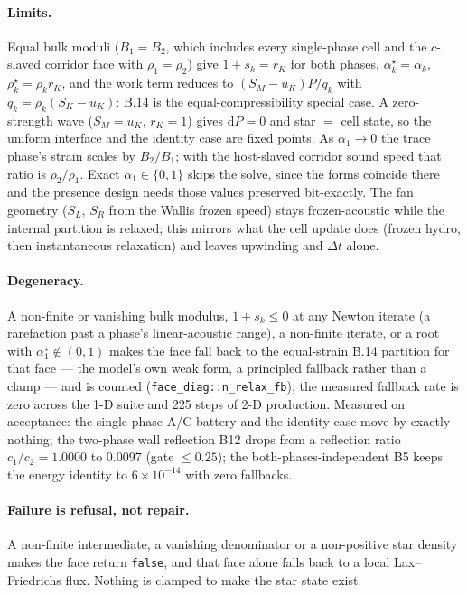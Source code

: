 \documentclass[11pt,a4paper]{article}
\newcommand{\code}[1]{\texttt{\small #1}}
\begin{document}
\paragraph{Limits.}
Equal bulk moduli ($B_1=B_2$, which includes every single-phase cell and the
$c$-slaved corridor face with $\rho_1=\rho_2$) give $1+s_k=r_K$ for both
phases, $\alpha_k^\star=\alpha_k$, $\rho_k^\star=\rho_kr_K$, and the work term
reduces to $(S_M-u_K)P/q_k$ with $q_k=\rho_k(S_K-u_K)$: B.14 is the
equal-compressibility special case.  A zero-strength wave ($S_M=u_K$,
$r_K=1$) gives $\mathrm{d}P=0$ and star $=$ cell state, so the uniform
interface and the identity case are fixed points.  As $\alpha_1\to0$ the
trace phase's strain scales by $B_2/B_1$; with the host-slaved corridor
sound speed that ratio is $\rho_2/\rho_1$.  Exact $\alpha_1\in\{0,1\}$ skips
the solve, since the forms coincide there and the presence design needs those
values preserved bit-exactly.  The fan geometry ($S_L$, $S_R$ from the Wallis
frozen speed) stays frozen-acoustic while the internal partition is relaxed;
this mirrors what the cell update does (frozen hydro, then instantaneous
relaxation) and leaves upwinding and $\Delta t$ alone.

\paragraph{Degeneracy.}
A non-finite or vanishing bulk modulus, $1+s_k\le0$ at any Newton iterate
(a rarefaction past a phase's linear-acoustic range), a non-finite iterate,
or a root with $\alpha_1^\star\notin(0,1)$ makes the face fall back to the
equal-strain B.14 partition for that face --- the model's own weak form, a
principled fallback rather than a clamp --- and is counted
(\code{face\_diag::n\_relax\_fb}); the measured fallback rate is zero across
the 1-D suite and 225 steps of 2-D production.  Measured on acceptance: the
single-phase A/C battery and the identity case move by exactly nothing; the
two-phase wall reflection B12 drops from a reflection ratio $c_1/c_2=1.0000$
to $0.0097$ (gate $\le0.25$); the both-phases-independent B5 keeps the
energy identity to $6\times10^{-14}$ with zero fallbacks.

\paragraph{Failure is refusal, not repair.}
A non-finite intermediate, a vanishing denominator or a non-positive star
density makes the face return \code{false}, and that face alone falls back to a
local Lax--Friedrichs flux.  Nothing is clamped to make the star state exist.
\end{document}
